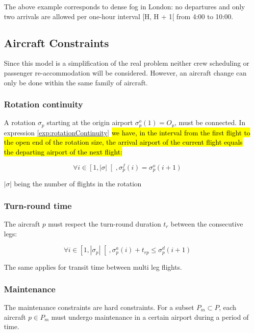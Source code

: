 \documentclass[ijoo,nonblindrev]{informs-ijoo}
\begin{document}
	The above example corresponds to dense fog in London: no departures and only two arrivals are allowed per one-hour interval [H, H + 1[ from 4:00 to 10:00.		

\subsection{Aircraft Constraints} \label{sec:aircConstraints}

Since this model is a simplification of the real problem neither crew scheduling or passenger re-accommodation will be considered. However, an aircraft change can only be done within the same family of aircraft.

\subsubsection{Rotation continuity}

A rotation $ \sigma_p$ starting  at the origin airport  $ \sigma^o_p(1) = O_p$, must be connected. In expression \ref{exp:rotationContinuity} \hl{we have, in the interval from the first flight to the open end of the rotation size, the arrival airport of the current flight equals the departing airport of the next flight:}

\begin{equation}
	\label{exp:rotationContinuity}
	\forall i \in \left[1, |\sigma|\right[, \sigma^f_p(i) = \sigma^o_p(i+1)
\end{equation}

$ |\sigma| $ being the number of flights in the rotation

\subsubsection{Turn-round time}

The aircraft $p$ must respect the turn-round duration  $t_r$ between the consecutive legs:

\begin{equation}
	\label{exp:turnroundtime}
	\forall i \in \left[1, |\sigma_p|\right[, \sigma^a_p(i) + t_{rp} \leq \sigma^d_p(i+1)
\end{equation}


The same applies for transit time between multi leg flights.

\subsubsection{Maintenance}
The maintenance constraints are hard constraints. For a subset $P_m \subset P$, each aircraft $p \in P_m$ must undergo maintenance in a certain airport during a period of time.
\end{document}
